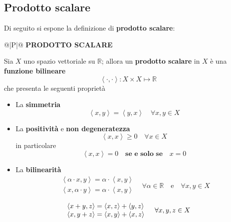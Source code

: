 \documentclass[a4paper]{extarticle}
\renewcommand\arraystretch{}
\begin{document}
\newpage
\noindent
\subsection{Prodotto scalare}
Di seguito si espone la definizione di \textbf{prodotto scalare}:

\vspace{1em}
\setlength{\tabcolsep}{14pt}
\renewcommand{\arraystretch}{2}
\noindent
\begin{tabularx}{\textwidth}{@{}|P|@{}}
    \hline
    {\textbf{PRODOTTO SCALARE}}\\
    \parbox{\linewidth}{Sia $X$ uno spazio vettoriale su $\mathbb{R}$; allora un \textbf{prodotto scalare} in $X$ è una \textbf{funzione bilineare}
    \[\left< \cdot, \cdot \right> : X \times X \longmapsto \mathbb{R}\]
    che presenta le seguenti proprietà
    \begin{itemize}
        \item La \textbf{simmetria}
        \[\left<x,y\right>=\left<y,x\right> \hspace{1em} \forall x,y \in X\]
        \item La \textbf{positività} e \textbf{non degeneratezza}
        \[\left<x,x\right>\geq 0 \hspace{1em} \forall x \in X\]in particolare
        \[\left<x,x\right>=0 \hspace{1em} \textbf{se e solo se} \hspace{1em} x=0\]
        \item La \textbf{bilinearità}
        \[
            \begin{array}{ll}
                \left<\alpha \cdot x, y \right> = \alpha \cdot \left<x,y\right>&\\
                \left< x, \alpha \cdot y \right> = \alpha \cdot \left<x,y\right>&\\
            \end{array}
            \forall \alpha \in \mathbb{R} \hspace{1em} \text{e} \hspace{1em} \forall x, y \in X
        \]
        \[
            \hspace{-2em}
            \begin{array}{ll}
                \left<x+y,z\right>=\left<x,z\right>+\left<y,z\right>&\\
                \left<x,y+z\right>=\left<x,y\right>+\left<x,z\right>&\\
            \end{array}
            \forall x, y, z \in X
        \]
    \end{itemize}
    \vspace{-1mm}}\\
    \hline
\end{tabularx}
\end{document}
